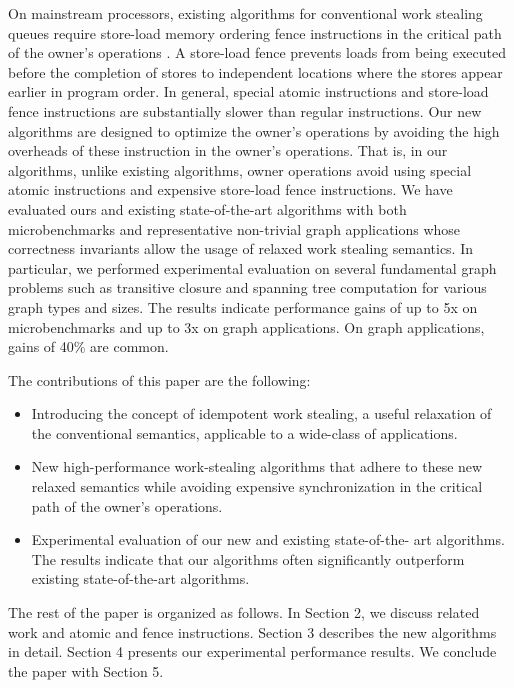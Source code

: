 On mainstream processors, existing algorithms for conventional work
stealing queues require store-load memory ordering fence instructions
in the critical path of the owner's operations \cite{Arora2001,
  Chase2005, Frigo1998, Hendler2006, Hendler2002}. A store-load fence
prevents loads from being executed before the completion of stores to
independent locations where the stores appear earlier in program
order. In general, special atomic instructions and store-load fence
instructions are substantially slower than regular instructions. Our
new algorithms are designed to optimize the owner's operations by
avoiding the high overheads of these instruction in the owner's
operations. That is, in our algorithms, unlike existing algorithms,
owner operations avoid using special atomic instructions and expensive
store-load fence instructions. We have evaluated ours and existing
state-of-the-art algorithms with both microbenchmarks and
representative non-trivial graph applications whose correctness
invariants allow the usage of relaxed work stealing semantics. In
particular, we performed experimental evaluation on several
fundamental graph problems such as transitive closure and spanning
tree computation for various graph types and sizes. The results
indicate performance gains of up to 5x on microbenchmarks and up to 3x
on graph applications. On graph applications, gains of 40\% are
common.

The contributions of this paper are the following:
\begin{itemize}
\item Introducing the concept of idempotent work stealing, a useful
 relaxation of the conventional semantics, applicable to a wide-class
  of applications.
\item New high-performance work-stealing algorithms that adhere to
  these new relaxed semantics while avoiding expensive synchronization
  in the critical path of the owner's operations.
\item Experimental evaluation of our new and existing state-of-the-
  art algorithms. The results indicate that our algorithms often
  significantly outperform existing state-of-the-art algorithms.
\end{itemize}

The rest of the paper is organized as follows. In Section 2, we
discuss related work and atomic and fence instructions. Section 3
describes the new algorithms in detail. Section 4 presents our
experimental performance results. We conclude the paper with Section
5.

